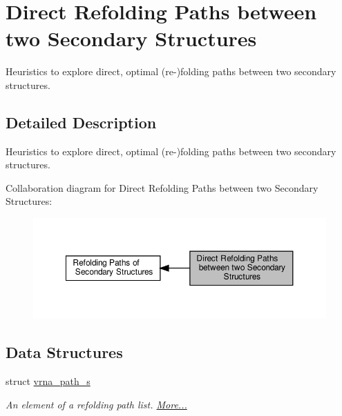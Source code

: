 \hypertarget{group__direct__paths}{}\section{Direct Refolding Paths between two Secondary Structures}
\label{group__direct__paths}


Heuristics to explore direct, optimal (re-\/)folding paths between two secondary structures.  




\subsection{Detailed Description}
Heuristics to explore direct, optimal (re-\/)folding paths between two secondary structures. 

Collaboration diagram for Direct Refolding Paths between two Secondary Structures\+:
\nopagebreak
\begin{figure}[H]
\begin{center}
\leavevmode
\includegraphics[width=350pt]{group__direct__paths}
\end{center}
\end{figure}
\subsection*{Data Structures}
\begin{DoxyCompactItemize}
\item 
struct \hyperlink{group__direct__paths_structvrna__path__s}{vrna\+\_\+path\+\_\+s}
\begin{DoxyCompactList}\small\item\em An element of a refolding path list.  \hyperlink{group__direct__paths_structvrna__path__s}{More...}\end{DoxyCompactList}\end{DoxyCompactItemize}
